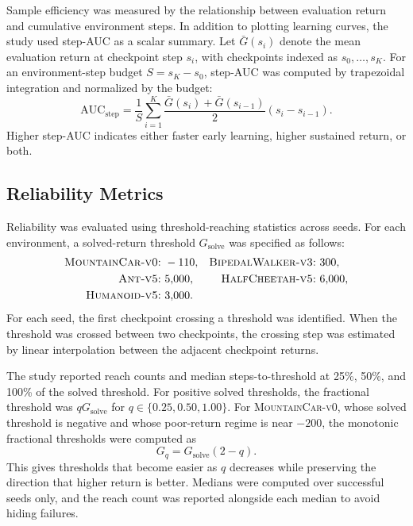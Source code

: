 Sample efficiency was measured by the relationship between evaluation return and cumulative environment steps.
In addition to plotting learning curves, the study used step-AUC as a scalar summary.
Let $\bar{G}(s_i)$ denote the mean evaluation return at checkpoint step $s_i$, with checkpoints indexed as $s_0,\ldots,s_K$.
For an environment-step budget $S=s_K-s_0$, step-AUC was computed by trapezoidal integration and normalized by the budget:
\begin{equation}
    \mathrm{AUC}_{\mathrm{step}}
    = \frac{1}{S}\sum_{i=1}^{K}
    \frac{\bar{G}(s_i)+\bar{G}(s_{i-1})}{2}
    (s_i-s_{i-1}).
\end{equation}
Higher step-AUC indicates either faster early learning, higher sustained return, or both.

\subsection{Reliability Metrics}
\label{subsec:methodology_reliability_metrics}

Reliability was evaluated using threshold-reaching statistics across seeds.
For each environment, a solved-return threshold $G_{\mathrm{solve}}$ was specified as follows:
\begin{equation}
\begin{aligned}
    \text{\textsc{MountainCar-v0}:} &\ -110, &
    \text{\textsc{BipedalWalker-v3}:} &\ 300,\\
    \text{\textsc{Ant-v5}:} &\ 5{,}000, &
    \text{\textsc{HalfCheetah-v5}:} &\ 6{,}000,\\
    \text{\textsc{Humanoid-v5}:} &\ 3{,}000.
\end{aligned}
\end{equation}
For each seed, the first checkpoint crossing a threshold was identified.
When the threshold was crossed between two checkpoints, the crossing step was estimated by linear interpolation between the adjacent checkpoint returns.

The study reported reach counts and median steps-to-threshold at 25\%, 50\%, and 100\% of the solved threshold.
For positive solved thresholds, the fractional threshold was $qG_{\mathrm{solve}}$ for $q\in\{0.25,0.50,1.00\}$.
For \textsc{MountainCar-v0}, whose solved threshold is negative and whose poor-return regime is near $-200$, the monotonic fractional thresholds were computed as
\begin{equation}
    G_q = G_{\mathrm{solve}}(2-q).
\end{equation}
This gives thresholds that become easier as $q$ decreases while preserving the direction that higher return is better.
Medians were computed over successful seeds only, and the reach count was reported alongside each median to avoid hiding failures.

